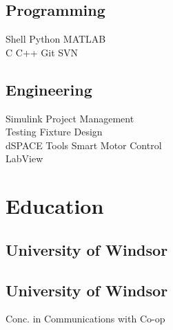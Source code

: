 \documentclass[]{deedy-resume-openfont}
\begin{document}
\begin{minipage}[t]{0.33\textwidth}
\subsection{Programming}
Shell \textbullet{} Python \textbullet{} MATLAB \\
C \textbullet{} C++ \textbullet{} Git \textbullet{} SVN\\
\sectionsep

\subsection{Engineering}
Simulink \textbullet{}   Project Management \\
Testing \textbullet{} Fixture Design \\ 
dSPACE Tools \textbullet{} Smart Motor Control \\
LabView
\sectionsep


\section{Education} 

\subsection{University of Windsor}
\sectionsep

\subsection{University of Windsor}
Conc. in Communications with Co-op \\
\sectionsep





\end{minipage}
\end{document}
